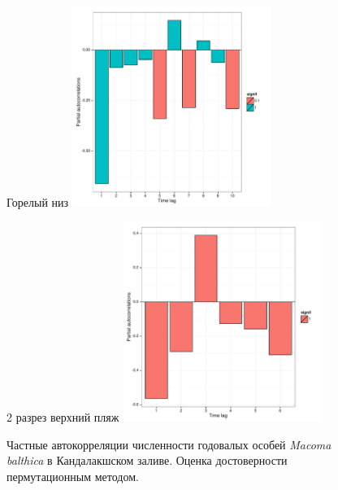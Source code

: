 \documentclass[12pt, a4paper]{disser}
\begin{document}
\begin{figure}[ht]
	\begin{minipage}[b]{.46\linewidth}
	\begin{center}
	{\tiny Горелый низ}
	\includegraphics[width=65mm]{../White_Sea/oneyear_all_Kandalaksha_all/perm_PRCF_Goreliy_low_N1y.pdf}
	\end{center}
	\end{minipage}
%
	\hfil %
%
	\begin{minipage}[b]{.46\linewidth}
	\begin{center}
	{\tiny 2 разрез верхний пляж}
	\includegraphics[width=65mm]{../White_Sea/oneyear_all_Kandalaksha_all/perm_PRCF_razrez2_high_beatch_N1y.pdf}
	\end{center}
	\end{minipage}

	\caption{Частные автокорреляции численности годовалых особей {\it Macoma balthica} в Кандалакшском заливе. Оценка достоверности пермутационным методом.}
	\label{ris:perm_PRCF_Kandalaksha_N1year}
	\end{figure}
\end{document}
